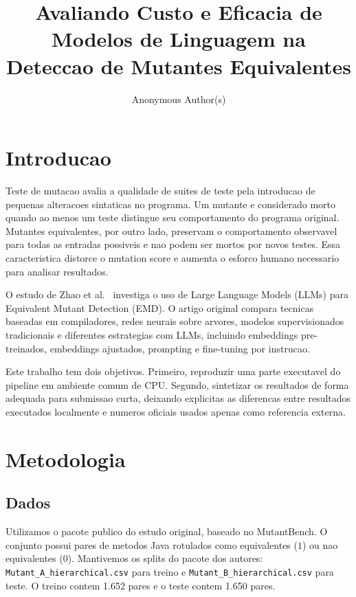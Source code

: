 \documentclass[sigconf,screen,nonacm]{acmart}
\title{Avaliando Custo e Eficacia de Modelos de Linguagem na Deteccao de Mutantes Equivalentes}
\author{Anonymous Author(s)}
\affiliation{%
  \institution{Anonymous Institution}
  \city{Anonymous City}
  \country{Anonymous Country}
}
\begin{document}
\maketitle

\section{Introducao}

Teste de mutacao avalia a qualidade de suites de teste pela introducao de pequenas alteracoes sintaticas no programa. Um mutante e considerado morto quando ao menos um teste distingue seu comportamento do programa original. Mutantes equivalentes, por outro lado, preservam o comportamento observavel para todas as entradas possiveis e nao podem ser mortos por novos testes. Essa caracteristica distorce o mutation score e aumenta o esforco humano necessario para analisar resultados.

O estudo de Zhao et al.~\cite{zhao2024emd} investiga o uso de Large Language Models (LLMs) para Equivalent Mutant Detection (EMD). O artigo original compara tecnicas baseadas em compiladores, redes neurais sobre arvores, modelos supervisionados tradicionais e diferentes estrategias com LLMs, incluindo embeddings pre-treinados, embeddings ajustados, prompting e fine-tuning por instrucao.

Este trabalho tem dois objetivos. Primeiro, reproduzir uma parte executavel do pipeline em ambiente comum de CPU. Segundo, sintetizar os resultados de forma adequada para submissao curta, deixando explicitas as diferencas entre resultados executados localmente e numeros oficiais usados apenas como referencia externa.

\section{Metodologia}

\subsection{Dados}

Utilizamos o pacote publico do estudo original, baseado no MutantBench. O conjunto possui pares de metodos Java rotulados como equivalentes (\(1\)) ou nao equivalentes (\(0\)). Mantivemos os splits do pacote dos autores: \texttt{Mutant\_A\_hierarchical.csv} para treino e \texttt{Mutant\_B\_hierarchical.csv} para teste. O treino contem 1.652 pares e o teste contem 1.650 pares.
\end{document}
